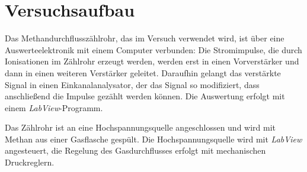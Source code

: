 \section{Versuchsaufbau}

Das Methandurchflusszählrohr, das im Versuch verwendet wird, ist über eine Auswerteelektronik mit
einem Computer verbunden: Die Stromimpulse, die durch Ionisationen im Zählrohr erzeugt werden, 
werden erst in einen Vorverstärker und dann in einen weiteren Verstärker geleitet.
Daraufhin gelangt das verstärkte Signal in einen Einkanalanalysator, der das Signal so modifiziert,
dass anschließend die Impulse gezählt werden können. Die Auswertung erfolgt mit einem
\textit{LabView}-Programm.

Das Zählrohr ist an eine Hochspannungsquelle angeschlossen und wird mit Methan aus einer Gasflasche gespült.
Die Hochspannungsquelle wird mit \textit{LabView} angesteuert, die Regelung des Gasdurchflusses erfolgt mit
mechanischen Druckreglern.